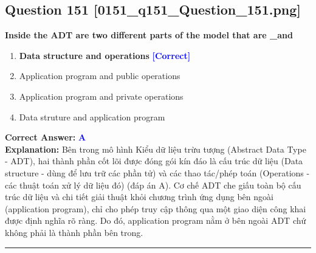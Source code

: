 \documentclass[11pt,a4paper]{article}
\begin{document}
\begin{minipage}{\textwidth}
\subsection*{Question 151 \quad \footnotesize{[0151\_q151\_Question\_151.png]}}
\noindent \textbf{Inside the ADT are two different parts of the model that are \_and}

\begin{enumerate}[label=\Alph*.]
    \item \textbf{Data structure and operations} \hfill \textcolor{blue}{\textbf{[Correct]}}
    \item Application program and public operations
    \item Application program and private operations
    \item Data struture and application program
\end{enumerate}

\noindent \textbf{Correct Answer:} \textcolor{blue}{\textbf{A}} \\[2pt]
\noindent \textbf{Explanation:} Bên trong mô hình Kiểu dữ liệu trừu tượng (Abstract Data Type - ADT), hai thành phần cốt lõi được đóng gói kín đáo là cấu trúc dữ liệu (Data structure - dùng để lưu trữ các phần tử) và các thao tác/phép toán (Operations - các thuật toán xử lý dữ liệu đó) (đáp án A). Cơ chế ADT che giấu toàn bộ cấu trúc dữ liệu và chi tiết giải thuật khỏi chương trình ứng dụng bên ngoài (application program), chỉ cho phép truy cập thông qua một giao diện công khai được định nghĩa rõ ràng. Do đó, application program nằm ở bên ngoài ADT chứ không phải là thành phần bên trong.

\par\vspace{0.3cm}
\hrule
\vspace{0.3cm}
\end{minipage}
\end{document}
